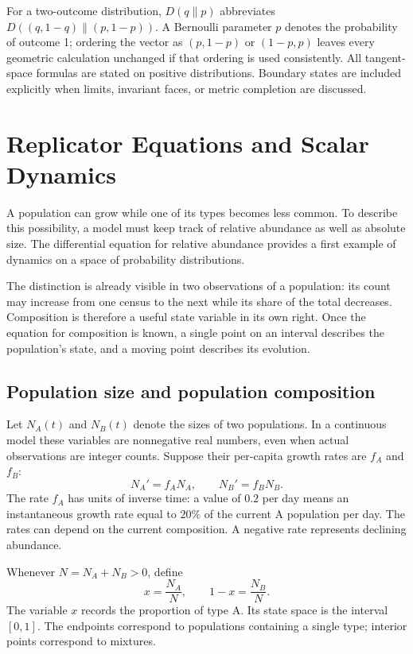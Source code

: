 \documentclass[11pt,oneside,openany]{book}
\theoremstyle{definition}
\theoremstyle{remark}
\numberwithin{equation}{chapter}
\begin{document}
For a two-outcome distribution, $D(q\|p)$ abbreviates $D((q,1-q)\|(p,1-p))$. A Bernoulli parameter $p$ denotes the probability of outcome 1; ordering the vector as $(p,1-p)$ or $(1-p,p)$ leaves every geometric calculation unchanged if that ordering is used consistently. All tangent-space formulas are stated on positive distributions. Boundary states are included explicitly when limits, invariant faces, or metric completion are discussed.
\mainmatter

\chapter{Replicator Equations and Scalar Dynamics}
\label{ch:scalar}

A population can grow while one of its types becomes less common. To describe this possibility, a model must keep track of relative abundance as well as absolute size. The differential equation for relative abundance provides a first example of dynamics on a space of probability distributions.

The distinction is already visible in two observations of a population: its count may increase from one census to the next while its share of the total decreases. Composition is therefore a useful state variable in its own right. Once the equation for composition is known, a single point on an interval describes the population's state, and a moving point describes its evolution.

\section{Population size and population composition}
Let $N_A(t)$ and $N_B(t)$ denote the sizes of two populations. In a continuous model these variables are nonnegative real numbers, even when actual observations are integer counts. Suppose their per-capita growth rates are $f_A$ and $f_B$:
\begin{equation}\label{eq:populations}
N_A'=f_A N_A,\qquad N_B'=f_B N_B.
\end{equation}
The rate $f_A$ has units of inverse time: a value of $0.2$ per day means an instantaneous growth rate equal to $20\%$ of the current A population per day. The rates can depend on the current composition. A negative rate represents declining abundance.

Whenever $N=N_A+N_B>0$, define
\[
x=\frac{N_A}{N},\qquad 1-x=\frac{N_B}{N}.
\]
The variable $x$ records the proportion of type A. Its state space is the interval $[0,1]$. The endpoints correspond to populations containing a single type; interior points correspond to mixtures.
\end{document}
